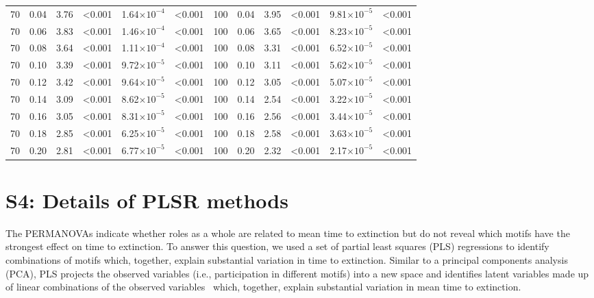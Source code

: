 \documentclass[12pt]{article}
\begin{document}
\begin{spacing}{2.0}
\begin{table}[h!]
\begin{tabular}{c c | c c| c c ||c c | c c | c c |}
	        70	&	0.04	&	3.76	&	\textless0.001	&	1.64$\times10^{-4}$	&	\textless0.001	&	100	&	0.04	&	3.95	&	\textless0.001	&	9.81$\times10^{-5}$	&	\textless0.001	\\
	        70	&	0.06	&	3.83	&	\textless0.001	&	1.46$\times10^{-4}$	&	\textless0.001	&	100	&	0.06	&	3.65	&	\textless0.001	&	8.23$\times10^{-5}$	&	\textless0.001	\\
	        70	&	0.08	&	3.64	&	\textless0.001	&	1.11$\times10^{-4}$	&	\textless0.001	&	100	&	0.08	&	3.31	&	\textless0.001	&	6.52$\times10^{-5}$	&	\textless0.001	\\
	        70	&	0.10	&	3.39	&	\textless0.001	&	9.72$\times10^{-5}$	&	\textless0.001	&	100	&	0.10	&	3.11	&	\textless0.001	&	5.62$\times10^{-5}$	&	\textless0.001	\\
	        70	&	0.12	&	3.42	&	\textless0.001	&	9.64$\times10^{-5}$	&	\textless0.001	&	100	&	0.12	&	3.05	&	\textless0.001	&	5.07$\times10^{-5}$	&	\textless0.001	\\
	        70	&	0.14	&	3.09	&	\textless0.001	&	8.62$\times10^{-5}$	&	\textless0.001	&	100	&	0.14	&	2.54	&	\textless0.001	&	3.22$\times10^{-5}$	&	\textless0.001	\\
	        70	&	0.16	&	3.05	&	\textless0.001	&	8.31$\times10^{-5}$	&	\textless0.001	&	100	&	0.16	&	2.56	&	\textless0.001	&	3.44$\times10^{-5}$	&	\textless0.001	\\
	        70	&	0.18	&	2.85	&	\textless0.001	&	6.25$\times10^{-5}$	&	\textless0.001	&	100	&	0.18	&	2.58	&	\textless0.001	&	3.63$\times10^{-5}$	&	\textless0.001	\\
	        70	&	0.20	&	2.81	&	\textless0.001	&	6.77$\times10^{-5}$	&	\textless0.001	&	100	&	0.20	&	2.32	&	\textless0.001	&	2.17$\times10^{-5}$	&	\textless0.001	\\

	    \end{tabular}
	    \end{table}
    
\clearpage

\section*{S4: Details of PLSR methods}

	The PERMANOVAs indicate whether roles as a whole are related to mean time to extinction but do not reveal which motifs have the strongest effect on time to extinction.
	To answer this question, we used a set of partial least squares (PLS) regressions to identify combinations of motifs which, together, explain substantial variation in time to extinction. 
	Similar to a principal components analysis (PCA), PLS projects the observed variables (i.e., participation in different motifs) into a new space and identifies latent variables made up of linear combinations of the observed variables~\citep{Mevik2004,pls} which, together, explain substantial variation in mean time to extinction.
	

\end{spacing}
\end{document}
